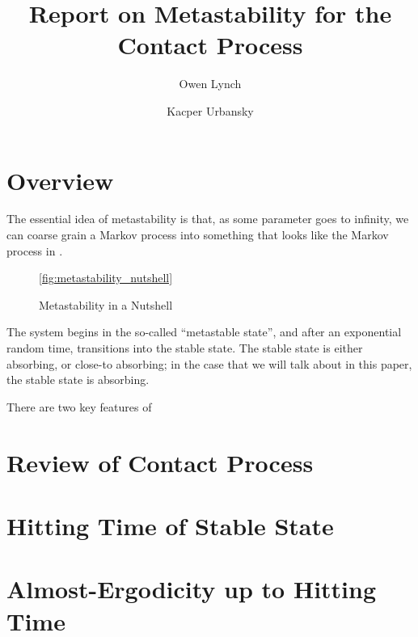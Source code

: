 \documentclass{scrartcl}
\title{Report on Metastability for the Contact Process}
\author{Owen Lynch \and Kacper Urbansky}
\begin{document}
\maketitle

\section{Overview}

The essential idea of metastability is that, as some parameter goes to infinity, we can coarse grain a Markov process into something that looks like the Markov process in .

\begin{figure}[h!]
  \centering

  \caption{Metastability in a Nutshell}
  \ref{fig:metastability_nutshell}
\end{figure}

The system begins in the so-called ``metastable state'', and after an exponential random time, transitions into the stable state. The stable state is either absorbing, or close-to absorbing; in the case that we will talk about in this paper, the stable state is absorbing.

There are two key features of

\section{Review of Contact Process}

\section{Hitting Time of Stable State}

\section{Almost-Ergodicity up to Hitting Time}
\end{document}
